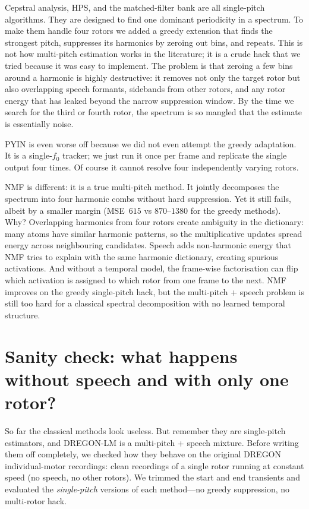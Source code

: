 \documentclass[11pt,a4paper]{article}
\begin{document}
Cepstral analysis, HPS, and the matched-filter bank are all single-pitch
algorithms.  They are designed to find one dominant periodicity in a spectrum.
To make them handle four rotors we added a greedy extension that finds the
strongest pitch, suppresses its harmonics by zeroing out bins, and repeats.
This is not how multi-pitch estimation works in the literature; it is a crude
hack that we tried because it was easy to implement.  The problem is that
zeroing a few bins around a harmonic is highly destructive: it removes not only
the target rotor but also overlapping speech formants, sidebands from other
rotors, and any rotor energy that has leaked beyond the narrow suppression
window.  By the time we search for the third or fourth rotor, the spectrum is
so mangled that the estimate is essentially noise.

PYIN is even worse off because we did not even attempt the greedy adaptation.
It is a single-$f_0$ tracker; we just run it once per frame and replicate the
single output four times.  Of course it cannot resolve four independently
varying rotors.

NMF is different: it is a true multi-pitch method.  It jointly decomposes the
spectrum into four harmonic combs without hard suppression.  Yet it still
fails, albeit by a smaller margin (MSE~$615$ vs $870$--$1380$ for the greedy
methods).  Why?  Overlapping harmonics from four rotors create ambiguity in
the dictionary: many atoms have similar harmonic patterns, so the multiplicative
updates spread energy across neighbouring candidates.  Speech adds non-harmonic
energy that NMF tries to explain with the same harmonic dictionary, creating
spurious activations.  And without a temporal model, the frame-wise
factorisation can flip which activation is assigned to which rotor from one
frame to the next.  NMF improves on the greedy single-pitch hack, but the
multi-pitch + speech problem is still too hard for a classical spectral
decomposition with no learned temporal structure.

\section{Sanity check: what happens without speech and with only one rotor?}

So far the classical methods look useless.  But remember they are
single-pitch estimators, and DREGON-LM is a multi-pitch + speech mixture.
Before writing them off completely, we checked how they behave on the original
DREGON individual-motor recordings: clean recordings of a single rotor
running at constant speed (no speech, no other rotors).  We trimmed the start
and end transients and evaluated the \emph{single-pitch} versions of each
method---no greedy suppression, no multi-rotor hack.
\end{document}
